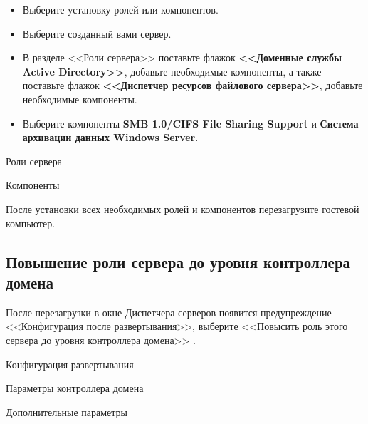 \begin{itemize}
	\item Выберите установку ролей или компонентов.
	\item Выберите созданный вами сервер.
	\item В разделе <<Роли сервера>> поставьте флажок
		\textbf{<<Доменные службы Active Directory>>},
		добавьте необходимые компоненты, а также поставьте флажок
		\textbf{<<Диспетчер ресурсов файлового сервера>>},
		добавьте необходимые компоненты.
	\item Выберите компоненты \textbf{SMB 1.0/CIFS File Sharing Support}
		и \textbf{Система архивации данных Windows Server}.
\end{itemize}

\begin{image}
	\caption{Роли сервера}
	\label{fig:rule}
\end{image}

\begin{image}
	\caption{Компоненты}
	\label{fig:components}
\end{image}

После установки всех необходимых ролей и компонентов перезагрузите гостевой
компьютер.

\subsection{Повышение роли сервера до уровня контроллера домена}

После перезагрузки в окне Диспетчера
серверов появится предупреждение <<Конфигурация после развертывания>>,
выберите <<Повысить роль этого сервера до уровня контроллера домена>>
.

\begin{image}
	\caption{Конфигурация развертывания}
	\label{fig:srule:config}
\end{image}

\begin{image}
	\caption{Параметры контроллера домена}
	\label{fig:srule:domen:contr}
\end{image}

\begin{image}
	\caption{Дополнительные параметры}
	\label{fig:srule:dopparams}
\end{image}

